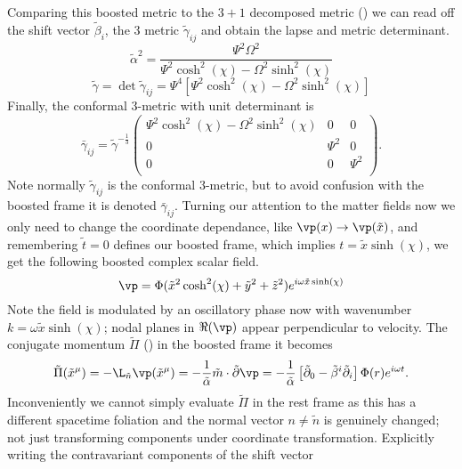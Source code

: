 Comparing this boosted metric to the $3+1$ decomposed metric () we can read off the shift vector $\tilde{\beta}_i$, the 3 metric $\tilde{\gamma}_{ij}$ and obtain the lapse and metric determinant.
\begin{equation} \tilde{\alpha}^2 = \frac{\Psi ^2 \Omega ^2}{\Psi ^2 \cosh ^2(\chi) -\Omega ^2 \sinh ^2(\chi) } \end{equation}
\begin{equation}\tilde{\gamma} = \det \tilde{\gamma}_{ij} = \Psi^4\left[ \Psi^2 \cosh^2 (\chi) - \Omega^2 \sinh^2(\chi)\right]\end{equation}
Finally, the conformal 3-metric with unit determinant is 
\begin{equation} \bar{\gamma}_{ij} = \tilde{\gamma}^{-\frac{1}{3}}\left(
\begin{array}{ccc}
 \Psi ^2 \cosh ^2(\chi) -\Omega ^2 \sinh ^2(\chi)  & 0 & 0 \\
 0 & \Psi ^2 & 0 \\
 0 & 0 & \Psi ^2 \\
\end{array}
\right).\end{equation}
Note normally $\tilde{\gamma}_{ij}$ is the conformal 3-metric, but to avoid confusion with the boosted frame it is denoted $\bar{\gamma}_{ij}$. Turning our attention to the matter fields now we only need to change the coordinate dependance, like $\vp(x)\rightarrow \vp(\tilde{x})$, and remembering $\tilde{t}=0$ defines our boosted frame, which implies $t = \tilde{x}\sinh(\chi)$, we get the following boosted complex scalar field.
\begin{equation}\vp = \Phi(\tilde{x}^2\cosh^2(\chi) +\tilde{y}^2 + \tilde{z}^2)e^{i\omega \tilde{x}\sinh(\chi)} \end{equation}
Note the field is modulated by an oscillatory phase now with wavenumber $k = \omega \tilde{x} \sinh(\chi)$; nodal planes in $\Re(\vp)$ appear perpendicular to velocity. The conjugate momentum $\tilde{\Pi}$ () in the boosted frame it becomes 
\[ \tilde{\Pi}(\tilde{x}^\mu) = -\L_{\tilde{n}} \vp(\tilde{x}^\mu)=-\frac{1}{\tilde{\alpha}}\tilde{m}\cdot \tilde{\partial}\vp = -\frac{1}{\tilde{\alpha}}\left[ \tilde{\partial}_0 - \tilde{\beta}^i\tilde{\partial}_{i}\right]\Phi(r)e^{i\omega t}.\]
Inconveniently we cannot simply evaluate $\tilde{\Pi}$ in the rest frame as this has a different spacetime foliation and the normal vector $n\neq \tilde{n}$ is genuinely changed; not just transforming components under coordinate transformation. Explicitly writing the contravariant components of the shift vector 
